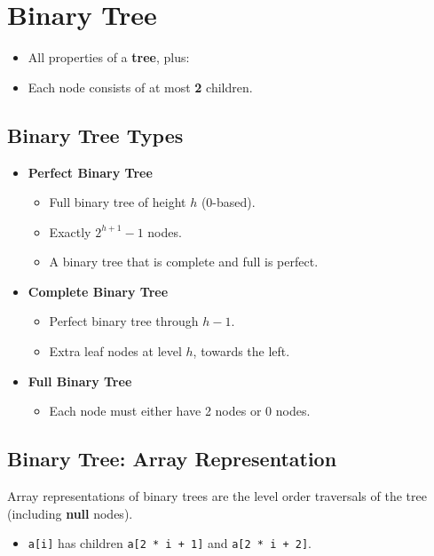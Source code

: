 \documentclass[12pt, letterpaper]{article}
\begin{document}
\section*{Binary Tree}
\begin{itemize}
    \item All properties of a \textbf{tree}, plus:
    \item Each node consists of at most \textbf{2} children.
\end{itemize}

\subsection*{Binary Tree Types}
\begin{itemize}
    \item \textbf{Perfect Binary Tree}
        \begin{itemize}
            \item Full binary tree of height \textbf{$ h $} (0-based).
            \item Exactly $ 2^{h+1} - 1 $ nodes.
            \item A binary tree that is complete and full is perfect.
        \end{itemize}
    \item \textbf{Complete Binary Tree}
        \begin{itemize}
            \item Perfect binary tree through \textbf{$ h - 1 $}.
            \item Extra leaf nodes at level \textbf{$ h $}, towards the left.
        \end{itemize}
    \item \textbf{Full Binary Tree}
        \begin{itemize}
            \item Each node must either have 2 nodes or 0 nodes.
        \end{itemize}
\end{itemize}

\subsection*{Binary Tree: Array Representation}

Array representations of binary trees are the level order traversals of the tree (including \textbf{null} nodes).

\begin{itemize}
    \item \texttt{a[i]} has children \texttt{a[2 * i + 1]} and \texttt{a[2 * i + 2]}.
\end{itemize}
\end{document}
